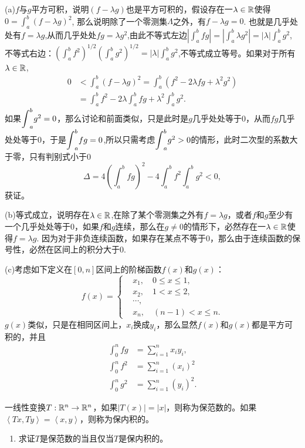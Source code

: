 \begin{problemset}
(a)$f$与$g$平方可积，说明$(f-\lambda{}g)$也是平方可积的，假设存在一$\lambda \in \mathbb{R}$使得$0 = \int_{a}^{b}{(f - \lambda{}g)^2}$, 那么说明除了一个零测集$\Lambda$之外，有$f - \lambda{}g = 0$. 也就是几乎处处有$f = \lambda{}g$,从而几乎处处$fg = \lambda{}g^2$,由此不等式左边$\left|\int_{a}^{b}{fg}\right| = \left|\int_{a}^{b}{\lambda{}g^2}\right| = |\lambda|\int_{a}^{b}{g^2}$, 不等式右边：$\left(\int_{a}^{b}{f^2}\right)^{1/2}\left(\int_{a}^{b}{g^2}\right)^{1/2} = |\lambda|\int_{a}^{b}{g^2}$,不等式成立等号。如果对于所有$\lambda \in \mathbb{R}$, 
\[
\begin{aligned}
0 &< \int_{a}^{b}{(f - \lambda{}g)^2} = \int_{a}^{b}{(f^2 -2\lambda{}fg + \lambda^2g^2)}\\
&=\int_{a}^{b}{f^2} - 2\lambda\int_{a}^{b}{fg} + \lambda^2\int_{a}^{b}{g^2}.
\end{aligned}
\]
如果${\displaystyle\int}_{a}^{b}{g^2} = 0$，那么讨论和前面类似，只是此时是$g$几乎处处等于0，从而$fg$几乎处处等于0，于是${\displaystyle\int}_{a}^{b}{fg} = 0$,所以只需考虑${\displaystyle\int}_{a}^{b}{g^2} > 0$的情形，此时二次型的系数大于零，只有判别式小于0
\[
\Delta = 4\left(\int_{a}^{b}{fg}\right)^2 - 4\int_{a}^{b}{f^2}\int_{a}^{b}{g^2} < 0,
\]
获证。

(b)等式成立，说明存在$\lambda \in \mathbb{R}$,在除了某个零测集之外有$f = \lambda{}g$，或者$f$和$g$至少有一个几乎处处等于0，如果$f$和$g$连续，那么在$g\neq 0$的情形下，必然存在一$\lambda \in \mathbb{R}$使得$f = \lambda{}g$. 因为对于非负连续函数，如果存在某点不等于0，那么由于连续函数的保号性，必然在区间上的积分大于0.

(c)考虑如下定义在$[0, n]$区间上的阶梯函数$f(x)$和$g(x)$：
\[
f(x) = \left\{
\begin{aligned}
&x_1, \quad 0 \le x \le 1,\\
&x_2, \quad 1 < x \le 2,\\
&\cdots, \\
&x_n, \quad (n-1) < x \le n.
\end{aligned}
\right.
\]
$g(x)$类似，只是在相同区间上，$x_i$换成$y_i$，那么显然$f(x)$和$g(x)$都是平方可积的，并且
\[
\begin{aligned}
\int_{0}^{n}{fg} &= \sum_{i=1}^{n}{x_iy_i},\\
\int_{0}^{n}{f^2} &= \sum_{i=1}^{n}{(x_i)^2}\\
\int_{0}^{n}{g^2} &= \sum_{i=1}^{n}{(y_i)^2}.
\end{aligned}
\]

\item 一线性变换$T:\mathbb{R}^n \to \mathbb{R}^n$，如果$|T(x)| = |x|$，则称为保范数的。如果$\left<Tx, Ty\right> = \left<x, y\right>$，则称为保内积的。
\begin{enumerate}
\item 求证$T$是保范数的当且仅当$T$是保内积的。


\end{enumerate}
\end{problemset}
